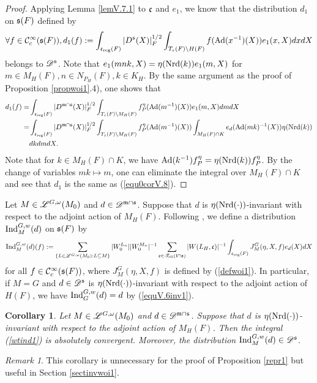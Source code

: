\documentclass[a4paper]{amsart}
\newcommand{\fm}{{\mathfrak{m}}} \newcommand{\fn}{{\mathfrak{n}}}\newcommand{\fo}{{\mathfrak{o}}} \newcommand{\fp}{{\mathfrak{p}}}
\newtheorem{coro}[thm]{Corollary}
\theoremstyle{definition}
\theoremstyle{remark}
\newtheorem{remark}[thm]{Remark}
\numberwithin{equation}{subsection}
\begin{document}
\begin{proof}
Applying Lemma \ref{lemV.7.1} to ${\mathfrak{c}}$ and $e_1$, we know that the distribution $d_1$ on ${\mathfrak{s}}(F)$ defined by
$$ \forall f\in{\mathcal {C}}_c^\infty({\mathfrak{s}}(F)), d_1(f):=\int_{{\mathfrak{c}}_{\mathrm{reg}}(F)} |D^{\mathfrak{s}}(X)|_F^{1/2} \int_{T_{\mathfrak{c}}(F)\backslash H(F)} f({\mathrm{Ad}}(x^{-1})(X)) e_1(x, X) dx dX $$
belongs to $\mathscr{D}^{\mathfrak{s}}$. Note that $e_1(mnk, X)=\eta({\mathrm{Nrd}}(k))e_1(m, X)$ for $m\in M_H(F), n\in N_{P_H}(F), k\in K_H$. By the same argument as the proof of Proposition \ref{propwoi1}.4), one shows that
\[\begin{split} 
d_1(f)=&\int_{\fc_\reg(F)} |D^{\fm\cap\fs}(X)|_F^{1/2} \int_{T_\fc(F)\bs M_H(F)} f_P^\eta(\Ad(m^{-1})(X)) e_1(m,X) dm dX \\
=&\int_{\fc_\reg(F)} |D^{\fm\cap\fs}(X)|_F^{1/2} \int_{T_\fc(F)\bs M_H(F)} f_P^\eta(\Ad(m^{-1})(X)) \int_{M_H(F)\cap K} e_d(\Ad(mk)^{-1}(X))\eta(\Nrd(k)) \\ 
&dk dm dX. 
\end{split}\]
Note that for $k\in M_H(F)\cap K$, we have ${\mathrm{Ad}}(k^{-1})f_P^\eta=\eta({\mathrm{Nrd}}(k))f_P^\eta$. By the change of variables $mk\mapsto m$, one can eliminate the integral over $M_H(F)\cap K$ and see that $d_1$ is the same as (\ref{equ0corV.8}). 
\end{proof}

Let $M\in\mathscr{L}^{G,\omega}(M_0)$ and $d\in\msd^{\fm\cap\fs}$. Suppose that $d$ is $\eta({\mathrm{Nrd}}(\cdot))$-invariant with respect to the adjoint action of $M_H(F)$. Following \cite[\S V.9]{MR1344131}, we define a distribution ${\mathrm{Ind}}_M^{G, w}(d)$ on ${\mathfrak{s}}(F)$ by
\begin{equation}\label{wtind1}
 {\mathrm{Ind}}_M^{G, w}(d)(f):=\sum_{\{L\in\mathscr{L}^{G,\omega}(M_0): L\subseteq M\}} |W_0^{L_n}| |W_0^{M_n}|^{-1} \sum_{{\mathfrak{c}}\in\mathscr{T}_{\mathrm{ell}}({\mathfrak{l}}\cap{\mathfrak{s}})} |W(L_H, {\mathfrak{c}})|^{-1} \int_{{\mathfrak{c}}_{\mathrm{reg}}(F)} J_M^G(\eta, X, f) e_d(X) dX
\end{equation}
for all $f\in{\mathcal {C}}_c^\infty({\mathfrak{s}}(F))$, where $J_M^G(\eta, X, f)$ is defined by (\ref{defwoi1}). In particular, if $M=G$ and $d\in\mathscr{D}^{\mathfrak{s}}$ is $\eta({\mathrm{Nrd}}(\cdot))$-invariant with respect to the adjoint action of $H(F)$, we have ${\mathrm{Ind}}_G^{G, w}(d)=d$ by (\ref{equV.6inv1}). 

\begin{coro}\label{corV.9.1}
Let $M\in\mathscr{L}^{G,\omega}(M_0)$ and $d\in\msd^{\fm\cap\fs}$. Suppose that $d$ is $\eta({\mathrm{Nrd}}(\cdot))$-invariant with respect to the adjoint action of $M_H(F)$. Then the integral (\ref{wtind1}) is absolutely convergent. Moreover, the distribution ${\mathrm{Ind}}_M^{G, w}(d)\in\mathscr{D}^{\mathfrak{s}}$. 
\end{coro}

\begin{remark}
This corollary is unnecessary for the proof of Proposition \ref{repr1} but useful in Section \ref{sectinvwoi1}. 
\end{remark}
\end{document}
